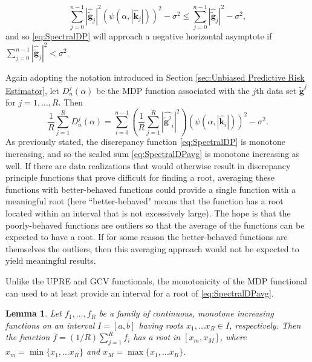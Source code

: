 \documentclass[12pt]{article}
\newcommand{\gnoise}{\widetilde{\mathbf{g}}}
\newcommand{\kdis}{\mathbf{k}}
\newcommand{\regparam}{\alpha}
\newcommand{\mfilt}{\psi}
\newcommand{\noiseSD}{\sigma}	%
\newcommand{\D}{D}	%
\newtheorem{lemma}{Lemma}[section]
\begin{document}
\[\sum_{j = 0}^{n-1} |\widehat{\gnoise}_j|^2(\mfilt(\regparam,|\widehat{\kdis}_j|))^2 - \noiseSD^2 \leq \sum_{j = 0}^{n-1} |\widehat{\gnoise}_j|^2 - \noiseSD^2,\]
and so \eqref{eq:SpectralDP} will approach a negative horizontal asymptote if $\sum_{j = 0}^{n-1} |\widehat{\gnoise}_j|^2 < \noiseSD^2$. \par 
Again adopting the notation introduced in Section \ref{sec:Unbiased Predictive Risk Estimator}, let $\D_n^j(\regparam)$ be the MDP function associated with the $j$th data set $\gnoise^j$ for $j = 1,\ldots,R$. Then 
\begin{equation}
\frac{1}{R}\sum_{j=1}^R \D_n^j(\regparam)  = \sum_{i = 0}^{n-1} \left(\frac{1}{R} \sum_{j=1}^R |\widehat{\gnoise^j}_i|^2\right)(\mfilt(\regparam,|\widehat{\kdis}_i|))^2 - \noiseSD^2. 
\label{eq:SpectralDPavg}
\end{equation}
As previously stated, the discrepancy function \eqref{eq:SpectralDP} is monotone increasing, and so the scaled sum \eqref{eq:SpectralDPavg} is monotone increasing as well. If there are data realizations that would otherwise result in discrepancy principle functions that prove difficult for finding a root, averaging these functions with better-behaved functions could provide a single function with a meaningful root (here ``better-behaved" means that the function has a root located within an interval that is not excessively large). The hope is that the poorly-behaved functions are outliers so that the average of the functions can be expected to have a root. If for some reason the better-behaved functions are themselves the outliers, then this averaging approach would not be expected to yield meaningful results. \par 
Unlike the UPRE and GCV functionals, the monotonicity of the MDP functional can used to at least provide an interval for a root of \eqref{eq:SpectralDPavg}. 
\begin{lemma}
Let $f_1,\ldots,f_R$ be a family of continuous, monotone increasing functions on an interval $I = [a,b]$ having roots $x_1,\ldots x_R \in I$, respectively. Then the function $\overline{f} = (1/R)\sum_{j=1}^R f_i$ has a root in $[x_m,x_M]$, where $x_m = \min\{x_1,\ldots x_R\}$ and $x_M = \max\{x_1,\ldots x_R\}$.
\end{lemma}
\end{document}

